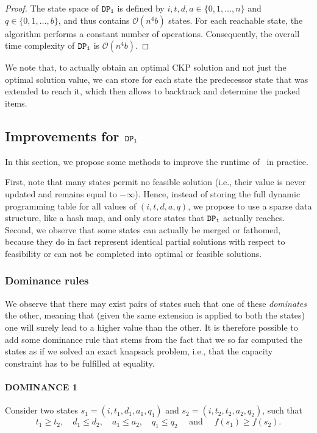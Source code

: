 \documentclass[preprint,11pt]{elsarticle}
\newcommand{\capacity}{b}
\newcommand{\firstDP}{{\tt DP_1}}
\theoremstyle{definition}
\begin{document}
\begin{proof}
\smallskip

The state space of $\firstDP$ is defined by
$i,t,d,a \in \{0,1,\dots,n\}$ and $q \in \{0,1,\dots,\capacity\}$, and thus contains
$\mathcal{O}(n^4 \capacity)$ states. 
For each reachable state, the algorithm performs a
constant number of operations. 
Consequently, the overall time complexity of $\firstDP$ is $\mathcal{O}(n^4 \capacity)$.
\end{proof}


\medskip

We note that, to actually obtain an optimal CKP solution and not just the optimal solution value, we can store for each state the predecessor state that was extended to reach it, which then allows to backtrack and determine the packed items. 

\subsection{Improvements for $\firstDP$}
\label{sec:DPimprovements}
In this section, we propose some methods to improve the runtime of~ in practice.

First, note that many states permit no feasible solution (i.e., their value is never updated and remains equal to $-\infty$). 
Hence, instead of storing the full dynamic programming table for all values of $(i,t,d,a,q)$, we propose to use a sparse data structure, like a hash map, and only store states that $\firstDP$ actually reaches. 
Second, we observe that some states can actually be merged or fathomed, because they do in fact represent identical partial solutions with respect to feasibility or can not be completed into optimal or feasible solutions.

\subsubsection{Dominance rules} We observe that there may exist pairs of states such that one of these \textit{dominates} the other, meaning that (given the same extension is applied to both the states) one will surely lead to a higher value than the other. It is therefore possible to add some dominance rule that stems from the fact that we so far computed the states as if we solved an exact knapsack problem, i.e., that the capacity constraint has to be fulfilled at equality.

\paragraph{DOMINANCE 1} Consider two states $s_1 = (i,t_1,d_1,a_1,q_1)$ and $s_2 = (i,t_2,t_2,a_2, q_2)$, such that
\begin{equation*}
t_1 \geq t_2, \quad d_1 \leq d_2, \quad a_1 \leq a_2, \quad q_1 \leq q_2 \quad \text{ and } \quad  f(s_1) \geq f(s_2).
\end{equation*}
\end{document}
